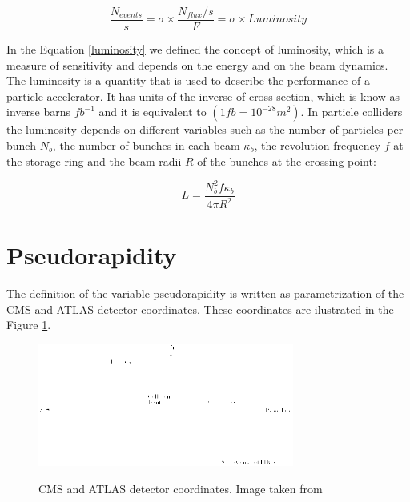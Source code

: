  \begin{equation}
 \label{luminosity}
  \frac{N_{events}}{s} = \sigma \times \frac{N_{flux}/s}{F} = \sigma \times Luminosity
 \end{equation}

 In the Equation \ref{luminosity} we defined the concept of luminosity, which is a measure of sensitivity and depends on the energy and on the beam dynamics.  The luminosity is a quantity that is used to 
 describe the performance of a particle accelerator. It has units of the inverse of cross section, which is know as inverse barns $fb^{-1}$ and it is equivalent to $(1 fb = 10^{-28} m^2)$. 
 In particle colliders the 
 luminosity depends on different variables such as the number of particles per bunch $N_b$, the number of bunches in each beam $\kappa_b$, the revolution frequency $f$ at the storage ring and the beam radii 
 $R$ of the bunches at the crossing point:
 
 \begin{equation}
  L = \frac{N_b^2 f \kappa_b}{4\pi R^2} 
 \end{equation}

 \section{Pseudorapidity}
 
 The definition of the variable pseudorapidity is written as parametrization of the CMS and ATLAS detector coordinates. These coordinates are ilustrated in the Figure \ref{CMSCoordinates}.
 
 \begin{figure}[h]
 \centering
 \caption{CMS and ATLAS detector coordinates. Image taken from \cite{CMS_ATLAS_coordinates}}
 \includegraphics[width=0.75\textwidth]{./Capitulos/VariableDefinitions/CMS_coordinates}  
 \label{CMSCoordinates}
 \end{figure}

